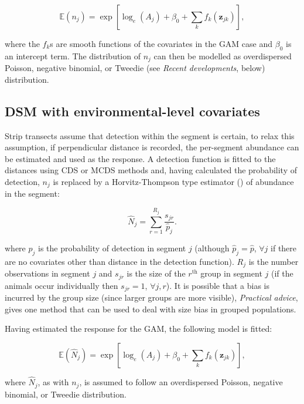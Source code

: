 \documentclass[a4paper,12pt]{article}
\begin{document}
\begin{equation}
\mathbb{E}(n_j) = \exp\left[ \log_e \left( A_j \right) + \beta_0 + \sum_k f_k\left(\bm{z}_{jk}\right) \right],
\label{e:stripgam}
\end{equation}

where the $f_k$s are smooth functions of the covariates in the GAM case and $\beta_0$ is an intercept term. The distribution of $n_j$ can then be modelled as overdispersed Poisson, negative binomial, or Tweedie (see \textit{Recent developments}, below) distribution.

\subsection*{DSM with environmental-level covariates}

Strip transects assume that detection within the segment is certain, to relax this assumption, if perpendicular distance is recorded, the per-segment abundance can be estimated and used as the response. A detection function is fitted to the distances using CDS or MCDS methods and, having calculated the probability of detection, $n_j$ is replaced by a Horvitz-Thompson type estimator (\cite{Thompson:2002wi}) of abundance in the segment:

\begin{equation*}
\hat{N}_j = \sum_{r=1}^{R_j} \frac{s_{jr}}{\hat{p}_j}.
\end{equation*}

where $\hat{p}_j$ is the probability of detection in segment $j$ (although $\hat{p}_j=\hat{p}$, $\forall j$ if there are no covariates other than distance in the detection function). $R_j$ is the number observations in segment $j$ and $s_{jr}$ is the size of the $r^\text{th}$ group in segment $j$ (if the animals occur individually then $s_{jr}=1$, $\forall j,r$). It is possible that a bias is incurred by the group size (since larger groups are more visible), \textit{Practical advice}, gives one method that can be used to deal with size bias in grouped populations.

Having estimated the response for the GAM, the following model is fitted:

\begin{equation}
\mathbb{E}(\hat{N}_j) = \exp\left[ \log_e \left( A_j \right) + \beta_0 + \sum_k f_k\left(\bm{z}_{jk}\right) \right],
\label{e:gamn}
\end{equation}

where $\hat{N}_j$, as with $n_j$, is assumed to follow an overdispersed Poisson, negative binomial, or Tweedie distribution.
\end{document}
